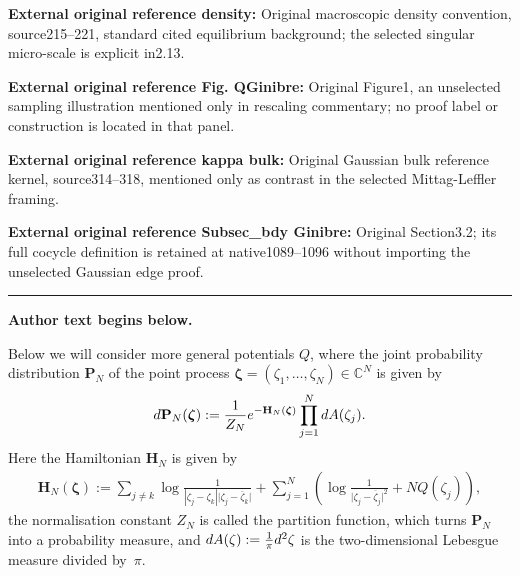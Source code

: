 \documentclass[11pt]{article}
\numberwithin{equation}{section}
\numberwithin{equation}{section}
\newcommand{\bfH}{{\mathbf H}}
\newcommand{\C}{{\mathbb C}}
\newcommand{\Prob}{{\mathbf{P}}}
\newcommand{\1}{\chi}
\begin{document}
\noindent\textbf{External original reference density:} Original macroscopic density convention, source215–221, standard cited equilibrium background; the selected singular micro-scale is explicit in2.13.\par
\noindent\textbf{External original reference Fig. QGinibre:} Original Figure1, an unselected sampling illustration mentioned only in rescaling commentary; no proof label or construction is located in that panel.\par
\noindent\textbf{External original reference kappa bulk:} Original Gaussian bulk reference kernel, source314–318, mentioned only as contrast in the selected Mittag-Leffler framing.\par
\noindent\textbf{External original reference Subsec\_bdy Ginibre:} Original Section3.2; its full cocycle definition is retained at native1089–1096 without importing the unselected Gaussian edge proof.\par
\medskip\hrule\medskip\noindent\textbf{Author text begins below.}\par
\setcounter{section}{1}\setcounter{equation}{0}
Below we will consider more general potentials $Q$, where the joint probability distribution $\Prob_N$ of the point process $\boldsymbol{\zeta}=(\zeta_1,\dots,\zeta_N) \in \C^N$ is given by
\begin{gather}\label{Gibbs}
	{\rm d} \Prob _N(\boldsymbol{\zeta}):= \frac{1}{Z_N} {\rm e}^{-\bfH_N( \boldsymbol{\zeta} )} \prod_{j=1}^N {\rm d}A(\zeta_j).
\end{gather}
Here the Hamiltonian $\bfH_N$ is given by
\begin{gather} \label{Ham}
	\bfH_N( \boldsymbol{\zeta} ):=\sum_{j\neq k} \log \frac{1}{|\zeta_j-\zeta_k| \big|\zeta_j-\overline{\zeta}_k\big| }+\sum_{j=1}^{N} \left( \log \frac{1}{\big| \zeta_j- \overline{\zeta}_j \big|^2}+ NQ(\zeta_j) \right),
\end{gather}
the normalisation constant $Z_N$ is called the partition function, which turns $\Prob _N$ into a probability measure, and ${\rm d}A(\zeta):=\tfrac{1}{\pi}{\rm d}^2\zeta$ is the two-dimensional Lebesgue measure divided by~$\pi$.

\setcounter{section}{1}
\end{document}
